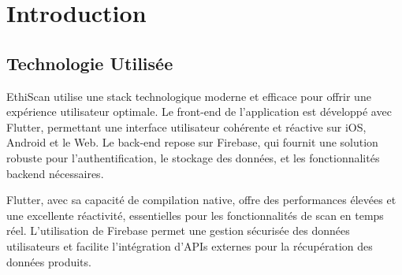 \section{Introduction}
\subsection{Technologie Utilisée}

EthiScan utilise une stack technologique moderne et efficace pour offrir une expérience utilisateur optimale. Le front-end de l'application est développé avec Flutter, permettant une interface utilisateur cohérente et réactive sur iOS, Android et le Web. Le back-end repose sur Firebase, qui fournit une solution robuste pour l'authentification, le stockage des données, et les fonctionnalités backend nécessaires.

Flutter, avec sa capacité de compilation native, offre des performances élevées et une excellente réactivité, essentielles pour les fonctionnalités de scan en temps réel. L'utilisation de Firebase permet une gestion sécurisée des données utilisateurs et facilite l'intégration d'APIs externes pour la récupération des données produits.